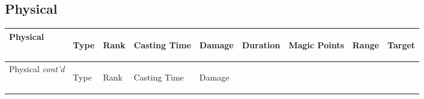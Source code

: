 \documentclass[twoside]{book}
\begin{document}
    

\subsection{Physical}
    
\begin{longtable}{p{1.25in}lp{2em}p{3em}llp{7em}ll} 
  Physical
  &
  \begin{turn}{70}{Type}\end{turn}
          
  &
  \begin{turn}{70}{Rank}\end{turn}
          
  &
  \begin{turn}{70}{Casting Time}\end{turn}
          
  &
  \begin{turn}{70}{Damage}\end{turn}
          
  &
  \begin{turn}{70}{Duration}\end{turn}
          
  &
  \begin{turn}{70}{Magic Points}\end{turn}
          
  &
  \begin{turn}{70}{Range}\end{turn}
          
  &
  \begin{turn}{70}{Target}\end{turn}
          
  \\
  \hline
  \hline
  \endfirsthead
  Physical \textit{cont'd}
        
  &
  \begin{turn}{70}{Type}\end{turn}
          
  &
  \begin{turn}{70}{Rank}\end{turn}
          
  &
  \begin{turn}{70}{Casting Time}\end{turn}
          
  &
  \begin{turn}{70}{Damage}\end{turn}
          

\end{longtable}
\end{document}
